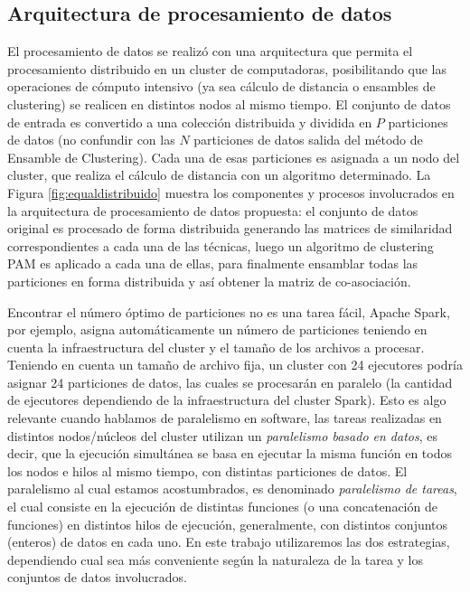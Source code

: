 \subsection{Arquitectura de procesamiento de datos}

El procesamiento de datos se realizó con una arquitectura que permita el procesamiento distribuido en un cluster de computadoras, posibilitando que las operaciones de cómputo intensivo (ya sea cálculo de distancia o ensambles de clustering) se realicen en distintos nodos al mismo tiempo. El conjunto de datos de entrada es convertido a una colección distribuida y dividida en \(P\) particiones de datos (no confundir con las \(N\) particiones de datos salida del método de Ensamble de Clustering). Cada una de esas particiones es asignada a un nodo del cluster, que realiza el cálculo de distancia con un algoritmo determinado. La Figura \ref{fig:equaldistribuido} muestra los componentes y procesos involucrados en la arquitectura de procesamiento de datos propuesta: el conjunto de datos original es procesado de forma distribuida generando las matrices de similaridad correspondientes a cada una de las técnicas, luego un algoritmo de clustering PAM es aplicado a cada una de ellas, para finalmente ensamblar todas las particiones en forma distribuida y así obtener la matriz de co-asociación.

\bigskip Encontrar el número óptimo de particiones no es una tarea fácil, Apache Spark, por ejemplo, asigna automáticamente un número de particiones teniendo en cuenta la infraestructura del cluster y el tamaño de los archivos a procesar. Teniendo en cuenta un tamaño de archivo fija, un cluster con 24 ejecutores podría asignar 24 particiones de datos, las cuales se procesarán en paralelo (la cantidad de ejecutores dependiendo de la infraestructura del cluster Spark). Esto es algo relevante cuando hablamos de paralelismo en software, las tareas realizadas en distintos nodos/núcleos del cluster utilizan un \textit{paralelismo basado en datos}, es decir, que la ejecución simultánea se basa en ejecutar la misma función en todos los nodos e hilos al mismo tiempo, con distintas particiones de datos. El paralelismo al cual estamos acostumbrados, es denominado \textit{paralelismo de tareas}, el cual consiste en la ejecución de distintas funciones (o una concatenación de funciones) en distintos hilos de ejecución, generalmente, con distintos conjuntos (enteros) de datos en cada uno. En este trabajo utilizaremos las dos estrategias, dependiendo cual sea más conveniente según la naturaleza de la tarea y los conjuntos de datos involucrados.

